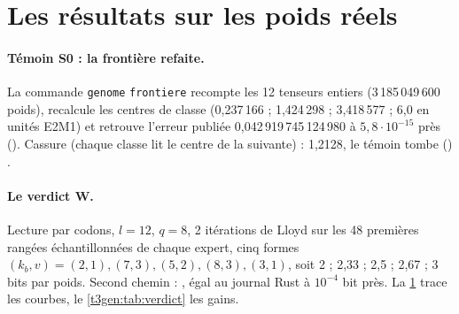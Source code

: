 \section{Les résultats sur les poids réels}\label{t3gen:sec:resultats}

\paragraph{Témoin S0 : la frontière refaite.} La commande \texttt{genome} \texttt{frontiere} recompte les 12 tenseurs entiers (3\,185\,049\,600 poids), recalcule les centres de classe (0,237\,166 ; 1,424\,298 ; 3,418\,577 ; 6,0 en unités E2M1) et retrouve l'erreur publiée 0,042\,919\,745\,124\,980 à $5{,}8\cdot10^{-15}$ près (). Cassure (chaque classe lit le centre de la suivante) : 1,2128, le témoin tombe () \mes.

\paragraph{Le verdict W.} Lecture par codons, $l = 12$, $q = 8$, 2 itérations de Lloyd sur les 48 premières rangées échantillonnées de chaque expert, cinq formes $(k_b, v) = (2, 1), (7, 3), (5, 2), (8, 3), (3, 1)$, soit 2 ; 2,33 ; 2,5 ; 2,67 ; 3 bits par poids. Second chemin : , égal au journal Rust à $10^{-4}$ bit près. La \cref{fig:t3-gen-courbes} trace les courbes, le \cref{t3gen:tab:verdict} les gains.

\begin{figure}[tbp]
\centering
\GrapheGenCourbes
{}
\label{fig:t3-gen-courbes}
\end{figure}

